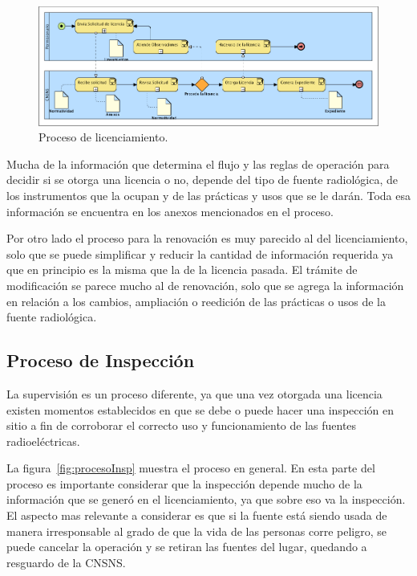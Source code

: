 \documentclass[10pt]{book}
\begin{document}
\begin{figure}[htbp!]
	\begin{center}
		\includegraphics[width=\textwidth]{images/procesoLic}
		\caption{Proceso de licenciamiento.}
		\label{fig:procesoLic}
	\end{center}
\end{figure}

	Mucha de la información que determina el flujo y las reglas de operación para decidir si se otorga una licencia o no, depende del tipo de fuente radiológica, de los instrumentos que la ocupan y de las prácticas y usos que se le darán. Toda esa información se encuentra en los anexos mencionados en el proceso.
	
	Por otro lado el proceso para la renovación es muy parecido al del licenciamiento, solo que se puede simplificar y reducir la cantidad de información requerida ya que en principio es la misma que la de la licencia pasada. El trámite de modificación se parece mucho al de renovación, solo que se agrega la información en relación a los cambios, ampliación o reedición de las prácticas o usos de la fuente radiológica.
	
\subsection{Proceso de Inspección}

	La supervisión es un proceso diferente, ya que una vez otorgada una licencia existen momentos establecidos en que se debe o puede hacer una inspección en sitio a fin de corroborar el correcto uso y funcionamiento de las fuentes radioeléctricas.
	
	La figura~\ref{fig:procesoInsp} muestra el proceso en general. En esta parte del proceso es importante considerar que la inspección depende mucho de la información que se generó en el licenciamiento, ya que sobre eso va la inspección. El aspecto mas relevante a considerar es que si la fuente está siendo usada de manera irresponsable al grado de que la vida de las personas corre peligro, se puede cancelar la operación y se retiran las fuentes del lugar, quedando a resguardo de la CNSNS. 
	
\end{document}
